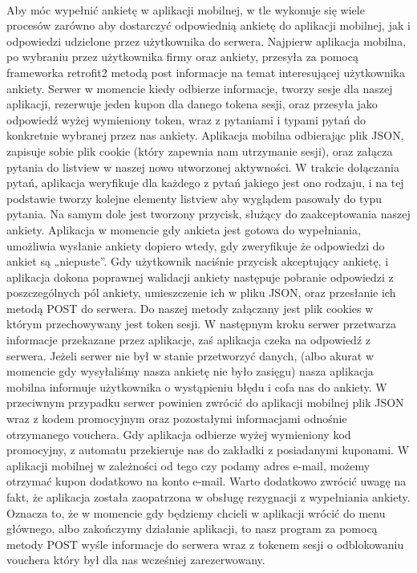 \paragraph{}
Aby móc wypełnić ankietę w aplikacji mobilnej, w tle wykonuje się wiele procesów zarówno aby dostarczyć odpowiednią ankietę do aplikacji mobilnej, jak i odpowiedzi udzielone przez użytkownika do serwera. Najpierw aplikacja mobilna, po wybraniu przez użytkownika firmy oraz ankiety, przesyła za pomocą frameworka retrofit2 metodą post informacje na temat interesującej użytkownika ankiety.
Serwer w momencie kiedy odbierze informacje, tworzy sesje dla naszej aplikacji, rezerwuje jeden kupon dla danego tokena sesji, oraz przesyła jako odpowiedź wyżej wymieniony token, wraz z pytaniami i typami pytań do konkretnie wybranej przez nas ankiety. Aplikacja mobilna odbierając plik JSON, zapisuje sobie plik cookie (który zapewnia nam utrzymanie sesji), oraz załącza pytania do listview w naszej nowo utworzonej aktywności. W trakcie dołączania pytań, aplikacja weryfikuje dla każdego z pytań jakiego jest ono rodzaju, i na tej podstawie tworzy kolejne elementy listview aby wyglądem pasowały do typu pytania. Na samym dole jest tworzony przycisk, służący do zaakceptowania naszej ankiety. Aplikacja w momencie gdy ankieta jest gotowa do wypełniania, umożliwia wysłanie ankiety dopiero wtedy, gdy zweryfikuje że odpowiedzi do ankiet są „niepuste”. 
Gdy użytkownik naciśnie przycisk akceptujący ankietę, i aplikacja dokona poprawnej walidacji ankiety następuje pobranie odpowiedzi z poszczególnych pól ankiety, umieszczenie ich w pliku JSON, oraz przesłanie ich metodą POST do serwera. Do naszej metody załączany jest plik cookies w którym przechowywany jest token sesji. W następnym kroku serwer przetwarza informacje przekazane przez aplikacje, zaś aplikacja czeka na odpowiedź z serwera. Jeżeli serwer nie był w stanie przetworzyć danych, (albo akurat w momencie gdy wysyłaliśmy nasza ankietę nie było zasięgu) nasza aplikacja mobilna informuje użytkownika o wystąpieniu błędu i cofa nas do ankiety. W przeciwnym przypadku serwer powinien zwrócić do aplikacji mobilnej plik JSON wraz z kodem promocyjnym oraz pozostałymi informacjami odnośnie otrzymanego vouchera. Gdy aplikacja odbierze wyżej wymieniony kod promocyjny, z automatu przekieruje nas do zakładki z posiadanymi kuponami.
W aplikacji mobilnej w zależności od tego czy podamy adres e-mail, możemy otrzymać kupon dodatkowo na konto e-mail. Warto dodatkowo zwrócić uwagę na fakt, że aplikacja została zaopatrzona w obsługę rezygnacji z wypełniania ankiety. Oznacza to, że w momencie gdy będziemy chcieli w aplikacji wrócić do menu głównego, albo zakończymy działanie aplikacji, to nasz program za pomocą metody POST wyśle informacje do serwera wraz z tokenem sesji o odblokowaniu vouchera który był dla nas wcześniej zarezerwowany.

